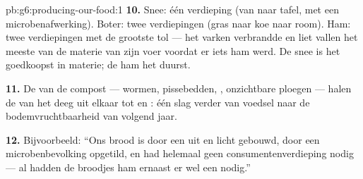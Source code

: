 \begin{solution}{pb:g6:producing-our-food:1}
\textbf{10.} Snee: één verdieping (van  naar tafel, met een
microbenafwerking). Boter: twee verdiepingen (gras naar koe naar room).
Ham: twee verdiepingen met de grootste tol --- het varken verbrandde en
liet vallen het meeste van de materie van zijn voer voordat er iets ham
werd. De snee is het goedkoopst in materie; de ham het duurst.

\textbf{11.} De  van de compost --- wormen, pissebedden,
, onzichtbare ploegen --- halen de  van het
deeg uit elkaar tot  en : één slag verder van voedsel
naar de bodemvruchtbaarheid van volgend jaar.

\textbf{12.} Bijvoorbeeld: ``Ons brood is door een  uit  en licht gebouwd, door een microbenbevolking opgetild, en had
helemaal geen consumentenverdieping nodig --- al hadden de broodjes ham
ernaast er wel een nodig.''
\end{solution}
